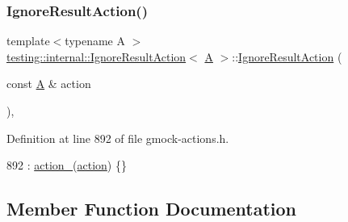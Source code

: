 \subsubsection{\texorpdfstring{Ignore\+Result\+Action()}{IgnoreResultAction()}}
{\footnotesize\ttfamily template$<$typename A $>$ \\
\hyperlink{classtesting_1_1internal_1_1IgnoreResultAction}{testing\+::internal\+::\+Ignore\+Result\+Action}$<$ \hyperlink{namespacetesting_a5e9134d655d2fc9323902348083282e7}{A} $>$\+::\hyperlink{classtesting_1_1internal_1_1IgnoreResultAction}{Ignore\+Result\+Action} (\begin{DoxyParamCaption}\item[{const \hyperlink{namespacetesting_a5e9134d655d2fc9323902348083282e7}{A} \&}]{action }\end{DoxyParamCaption})\hspace{0.3cm}{\ttfamily [inline]}, {\ttfamily [explicit]}}



Definition at line 892 of file gmock-\/actions.\+h.


\begin{DoxyCode}
892 : \hyperlink{classtesting_1_1internal_1_1IgnoreResultAction_a3a1ad6d29d904acb4ca41eeee45de4a0}{action\_}(\hyperlink{namespaceupload_a675d13c979f1c720866d22ed1736f580}{action}) \{\}
\end{DoxyCode}


\subsection{Member Function Documentation}
\mbox{\label{classtesting_1_1internal_1_1IgnoreResultAction_a6d42dfd3fd05fbbd24f6856e7bd82ab9}} 
